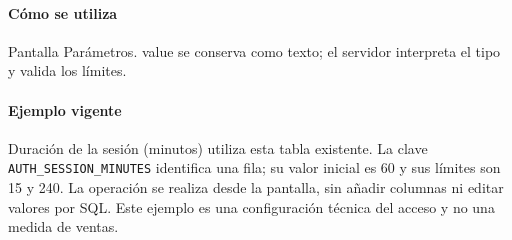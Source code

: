 \paragraph{Cómo se utiliza} Pantalla Parámetros. value se conserva como texto; el servidor interpreta el tipo y valida los límites.

\paragraph{Ejemplo vigente} Duración de la sesión (minutos) utiliza esta tabla existente. La clave \texttt{AUTH\_SESSION\_MINUTES} identifica una fila; su valor inicial es 60 y sus límites son 15 y 240. La operación se realiza desde la pantalla, sin añadir columnas ni editar valores por SQL. Este ejemplo es una configuración técnica del acceso y no una medida de ventas.

